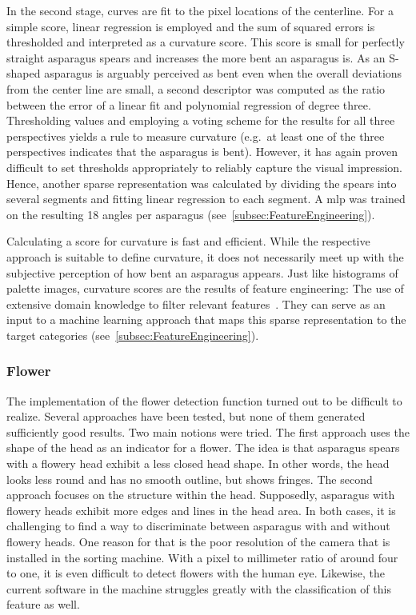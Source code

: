 In the second stage, curves are fit to the pixel locations of the centerline. For a simple score, linear regression is employed and the sum of squared errors is thresholded and interpreted as a curvature score. This score is small for perfectly straight asparagus spears and increases the more bent an asparagus is. As an S-shaped asparagus is arguably perceived as bent even when the overall deviations from the center line are small, a second descriptor was computed as the ratio between the error of a linear fit and polynomial regression of degree three. Thresholding values and employing a voting scheme for the results for all three perspectives yields a rule to measure curvature (e.g.\ at least one of the three perspectives indicates that the asparagus is bent). However, it has again proven difficult to set thresholds appropriately to reliably capture the visual impression. Hence, another sparse representation was calculated by dividing the spears into several segments and fitting linear regression to each segment. A \acrfull{mlp} was trained on the resulting 18 angles per asparagus (see~\autoref{subsec:FeatureEngineering}).

\bigskip
Calculating a score for curvature is fast and efficient. While the respective approach is suitable to define curvature, it does not necessarily meet up with the subjective perception of how bent an asparagus appears. Just like histograms of palette images, curvature scores are the results of feature engineering: The use of extensive domain knowledge to filter relevant features~\citep{zheng2018feature}. They can serve as an input to a machine learning approach that maps this sparse representation to the target categories (see~\autoref{subsec:FeatureEngineering}).


\subsubsection{Flower}
\label{subsec:Flower}

The implementation of the flower detection function turned out to be difficult to realize. Several approaches have been tested, but none of them generated sufficiently good results. Two main notions were tried. The first approach uses the shape of the head as an indicator for a flower. The idea is that asparagus spears with a flowery head exhibit a less closed head shape. In other words, the head looks less round and has no smooth outline, but shows fringes. The second approach focuses on the structure within the head. Supposedly, asparagus with flowery heads exhibit more edges and lines in the head area. In both cases, it is challenging to find a way to discriminate between asparagus with and without flowery heads. One reason for that is the poor resolution of the camera that is installed in the sorting machine. With a pixel to millimeter ratio of around four to one, it is even difficult to detect flowers with the human eye. Likewise, the current software in the machine struggles greatly with the classification of this feature as well.


